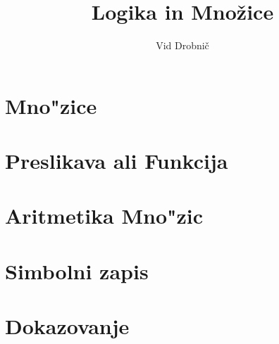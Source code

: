 \documentclass[a4paper, 12pt]{article}
\title{Logika in Množice}
\author{Vid Drobnič}
\date{}
\begin{document}
	\maketitle
	\thispagestyle{empty}
	\pagebreak
	\setcounter{page}{1}
	
	\tableofcontents
	\pagebreak
	
	\section{Mno"zice}
	
	
	\section{Preslikava ali Funkcija}
	
	
	\section{Aritmetika Mno"zic}
	
	
	\section{Simbolni zapis}
	
	
	\section{Dokazovanje}
	
\end{document}
